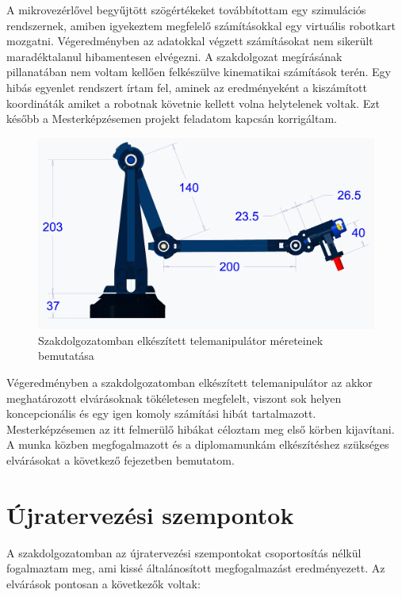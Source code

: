 A mikrovezérlővel begyűjtött szögértékeket továbbítottam egy szimulációs rendszernek, amiben igyekeztem megfelelő számításokkal egy virtuális robotkart mozgatni. Végeredményben az adatokkal végzett számításokat nem sikerült maradéktalanul hibamentesen elvégezni. A szakdolgozat megírásának pillanatában nem voltam kellően felkészülve kinematikai számítások terén. Egy hibás egyenlet rendszert írtam fel, aminek az eredményeként a kiszámított koordináták amiket a robotnak követnie kellett volna helytelenek voltak. Ezt később a Mesterképzésemen projekt feladatom kapcsán korrigáltam.\cite{szakdoga}

\begin{figure}[!ht]
\centering
\includegraphics[width=120mm, keepaspectratio]{figures/Szakdoga/00_v_4_kar}
\caption{Szakdolgozatomban elkészített telemanipulátor méreteinek bemutatása\cite{szakdoga}}
\label{fig:Szakdoga_telemanip_meret}
\end{figure}

Végeredményben a szakdolgozatomban elkészített telemanipulátor az akkor meghatározott elvárásoknak tökéletesen megfelelt, viszont sok helyen koncepcionális és egy igen komoly számítási hibát tartalmazott. Mesterképzésemen az itt felmerülő hibákat céloztam meg első körben kijavítani. A munka közben megfogalmazott és a diplomamunkám elkészítéshez szükséges elvárásokat a következő fejezetben bemutatom.

\section{Újratervezési szempontok}
\label{sec:ujratervezesi_szempontok}

A szakdolgozatomban az újratervezési szempontokat csoportosítás nélkül fogalmaztam meg, ami kissé általánosított megfogalmazást eredményezett. Az elvárások pontosan a következők voltak:

